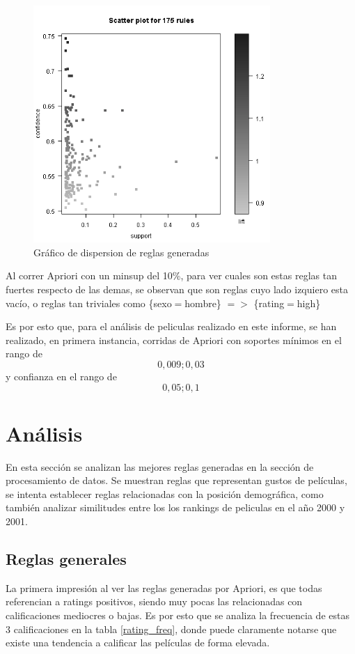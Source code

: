 \documentclass[journal]{IEEEtran}
\begin{document}
\begin{figure}[ht!]
\centering
\includegraphics[width=90mm]{arulesviz.png}
\caption{Gráfico de dispersion de reglas generadas}
\label{arulesviz}
\end{figure}

Al correr Apriori con un minsup del 10\%, para ver cuales son estas reglas tan
fuertes respecto de las demas, se observan que son reglas cuyo lado izquiero
esta vacío, o reglas tan triviales como \{sexo$=$hombre\} $=$$>$ \{rating$=$high\}

Es por esto que, para el análisis de peliculas realizado en este informe, se han
realizado, en primera instancia, 
 corridas de Apriori con soportes mínimos en el rango de \[0,009 ; 0,03\]
y confianza en el rango de \[0,05 ; 0,1\]

\section{Análisis}
En esta sección se analizan las mejores reglas generadas en la sección
de procesamiento de datos. Se muestran reglas que representan gustos
de películas, se intenta establecer reglas relacionadas con la
posición demográfica, como también analizar similitudes entre los
los rankings de peliculas en el año 2000 y 2001.

\subsection{Reglas generales}
La primera impresión al ver las reglas generadas por Apriori, es que todas 
referencian a ratings positivos, siendo muy pocas las relacionadas con 
calificaciones mediocres o bajas. Es por esto que se analiza la frecuencia
de estas 3 calificaciones en la tabla \ref{rating_freq}, donde puede
claramente notarse que existe una tendencia a calificar las 
películas de forma elevada.
\end{document}
